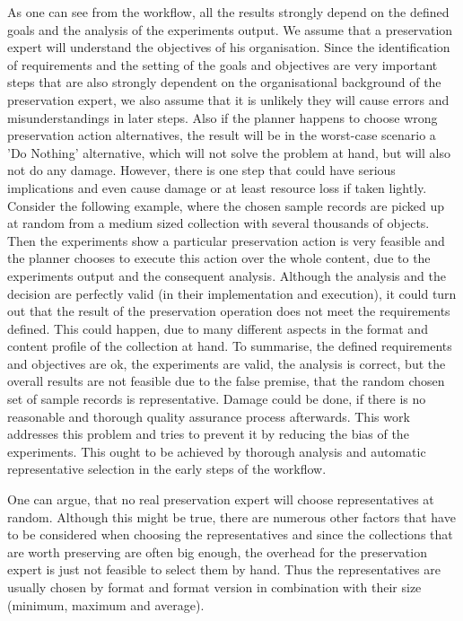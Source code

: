 As one can see from the workflow, all the results strongly depend on the defined goals and the analysis of the experiments output. We assume that a preservation expert will understand the objectives of his organisation. Since the identification of requirements and the setting of the goals and objectives are very important steps that are also strongly dependent on the organisational background of the preservation expert, we also assume that it is unlikely they will cause errors and misunderstandings in later steps. Also if the planner happens to choose wrong preservation action alternatives, the result will be in the worst-case scenario a 'Do Nothing' alternative, which will not solve the problem at hand, but will also not do any damage.
However, there is one step that could have serious implications and even cause damage or at least resource loss if taken lightly. Consider the following example, where the chosen sample records are picked up at random from a medium sized collection with several thousands of objects. Then the experiments show a particular preservation action is very feasible and the planner chooses to execute this action over the whole content, due to the experiments output and the consequent analysis. Although the analysis and the decision are perfectly valid (in their implementation and execution), it could turn out that the result of the preservation operation does not meet the requirements defined. This could happen, due to many different aspects in the format and content profile of the collection at hand. To summarise, the defined requirements and objectives are ok, the experiments are valid, the analysis is correct, but the overall results are not feasible due to the false premise, that the random chosen set of sample records is representative. Damage could be done, if there is no reasonable and thorough quality assurance process afterwards. This work addresses this problem and tries to prevent it by reducing the bias of the experiments. This ought to be achieved by thorough analysis and automatic representative selection in the early steps of the workflow.

One can argue, that no real preservation expert will choose representatives at random. Although this might be true, there are numerous other factors that have to be considered when choosing the representatives and since the collections that are worth preserving are often big enough, the overhead for the preservation expert is just not feasible to select them by hand. Thus the representatives are usually chosen by format and format version in combination with their size (minimum, maximum and average).

